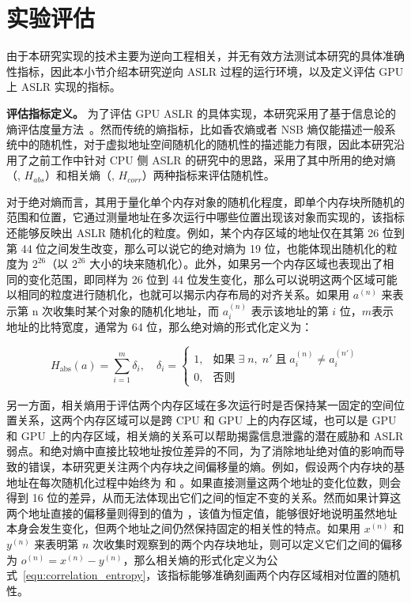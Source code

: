 \section{实验评估}
由于本研究实现的技术主要为逆向工程相关，并无有效方法测试本研究的具体准确性指标，因此本小节介绍本研究逆向 ASLR 过程的运行环境，以及定义评估 GPU 上 ASLR 实现的指标。

\textbf{评估指标定义。}
为了评估 GPU ASLR 的具体实现，本研究采用了基于信息论的熵评估度量方法~\cite{Kullback1951Information}。然而传统的熵指标，比如香农熵或者 NSB 熵仅能描述一般系统中的随机性，对于虚拟地址空间随机化的随机性的描述能力有限，因此本研究沿用了之前工作中针对 CPU 侧 ASLR 的研究中的思路，采用了其中所用的绝对熵 （, $H_{abs}$）和相关熵（, $H_{corr}$）两种指标来评估随机性。

对于绝对熵而言，其用于量化单个内存对象的随机化程度，即单个内存块所随机的范围和位置，它通过测量地址在多次运行中哪些位置出现该对象而实现的，该指标还能够反映出 ASLR 随机化的粒度。例如，某个内存区域的地址仅在其第 26 位到第 44 位之间发生改变，那么可以说它的绝对熵为 19 位，也能体现出随机化的粒度为 $2^{26}$（以 $2^{26}$ 大小的块来随机化）。此外，如果另一个内存区域也表现出了相同的变化范围，即同样为 26 位到 44 位发生变化，那么可以说明这两个区域可能以相同的粒度进行随机化，也就可以揭示内存布局的对齐关系。如果用  \( a^{(n)} \) 来表示第 n 次收集时某个对象的随机化地址，而  \( a_i^{(n)} \) 表示该地址的第 \( i \) 位，\( m \)表示地址的比特宽度，通常为 64 位，那么绝对熵的形式化定义为：

\begin{equation}
    \label{equ:absolute_entropy}
    H_{\text{abs}}(a) = \sum_{i=1}^{m} \delta_i, \quad \delta_i = 
    \begin{cases} 
    1, & \text{如果}\;\exists\; n,\; n'\;\text{且}\; a_i^{(n)} \ne a_i^{(n')} \\
    0, & \text{否则}
    \end{cases}
\end{equation}

另一方面，相关熵用于评估两个内存区域在多次运行时是否保持某一固定的空间位置关系，这两个内存区域可以是跨 CPU 和 GPU 上的内存区域，也可以是 GPU 和 GPU 上的内存区域，相关熵的关系可以帮助揭露信息泄露的潜在威胁和 ASLR 弱点。和绝对熵中直接比较地址按位差异的不同，为了消除地址绝对值的影响而导致的错误，本研究更关注两个内存块之间偏移量的熵。例如，假设两个内存块的基地址在每次随机化过程中始终为  和 。如果直接测量这两个地址的变化位数，则会得到 16 位的差异，从而无法体现出它们之间的恒定不变的关系。然而如果计算这两个地址直接的偏移量则得到的值为 ，该值为恒定值，能够很好地说明虽然地址本身会发生变化，但两个地址之间仍然保持固定的相关性的特点。如果用 \( x^{(n)} \) 和 \( y^{(n)} \) 来表明第 \( n \) 次收集时观察到的两个内存块地址，则可以定义它们之间的偏移为 $o^{(n)} = x^{(n)} - y^{(n)}$，那么相关熵的形式化定义为公式~\ref{equ:correlation_entropy}，该指标能够准确刻画两个内存区域相对位置的随机性。

